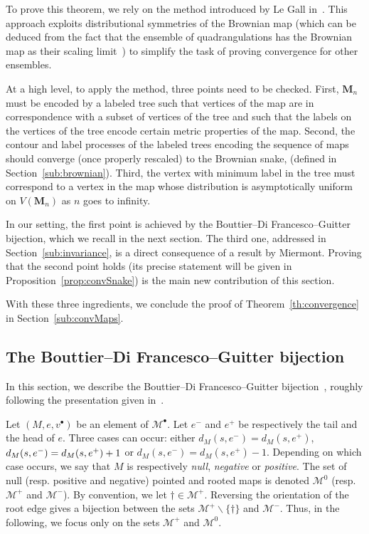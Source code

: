 \documentclass[AHL,Unicode,longabstracts,published]{cedram}
\newcommand{\cM}{\mathcal{M}}
\newcommand{\bM}{\mathbf{M}}
\newcommand{\sbt}{{\ensuremath{\scriptscriptstyle\bullet}}}
\begin{document}
To prove this theorem, we rely on the method introduced by Le Gall in~\cite[Section~8]{LeGallUniqueness}. This approach exploits distributional symmetries of the Brownian map (which can be deduced from the fact that the ensemble of quadrangulations has the Brownian map as their scaling limit~\cite{LeGallUniqueness,MiermontBrownian}) to simplify the task of proving convergence for other ensembles.

At a high level, to apply the method, three points need to be checked. First, $\bM_n$ must be encoded by a labeled tree such that vertices of the map are in correspondence with a subset of vertices of the tree and such that the labels on the vertices of the tree encode certain metric properties of the map. Second, the contour and label processes of the labeled trees encoding the sequence of maps should converge (once properly rescaled) to the Brownian snake, (defined in Section~\ref{sub:brownian}). Third, the vertex with minimum label in the tree must correspond to a vertex in the map whose distribution is asymptotically uniform on $V(\bM_n)$ as $n$ goes to infinity.

In our setting, the first point is achieved by the Bouttier--Di Francesco--Guitter bijection, which we recall in the next section. The third one, addressed in Section~\ref{sub:invariance}, is a direct consequence of a result by Miermont. Proving that the second point holds (its precise statement will be given in Proposition~\ref{prop:convSnake}) is the main new contribution of this section.

With these three ingredients, we conclude the proof of Theorem~\ref{th:convergence} in Section~\ref{sub:convMaps}.


\subsection{The Bouttier--Di Francesco--Guitter bijection}\label{sub:BDG}
In this section, we describe the Bouttier--Di Francesco--Guitter bijection~\cite{BDG2004}, roughly following the presentation given in~\cite{CurienLeGallMiermontCactus}.

Let $(M,e,v^\sbt)$ be an element of $\cM^\bullet$. Let $e^-$ and $e^+$ be respectively the tail and the head of $e$. Three cases can occur: either $d_M(s,e^-)=d_M(s,e^+)$, $d_M(s,e^-)\linebreak=d_M(s,e^+)+1$ or $d_M(s,e^-)=d_M(s,e^+)-1$. Depending on which case occurs, we say that $M$ is respectively \emph{null}, \emph{negative} or \emph{positive}. The set of null (resp. positive and negative) pointed and rooted maps is denoted $\cM^0$ (resp. $\cM^+$ and $\cM^-$). By convention, we let $\dagger \in \cM^+$. Reversing the orientation of the root edge gives a bijection between the sets $\cM^+\backslash\{\dagger\}$ and $\cM^-$. Thus, in the following, we focus only on the sets $\cM^+$ and $\cM^0$.
\end{document}
